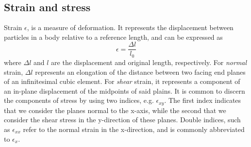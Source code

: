 \documentclass[twoside,english]{uiofysmaster}
\begin{document}
\subsection{Strain and stress}
Strain $\epsilon$, is a measure of deformation. 
It represents the displacement between particles in a body relative to a reference length, and can be expressed as
\begin{equation}
\epsilon = \frac{\Delta l}{l_0}
\end{equation}
where $\Delta l$ and $l$ are the displacement and original length, respectively. 
For \textit{normal} strain, $\Delta l$ represents an elongation of the distance between two facing end planes of an infinitesimal cubic element.
For \textit{shear} strain, it represents a component of an in-plane displacement of the midpoints of said plains.
It is common \cite{theoryOfElasticity,introductionToElasticity} to discern the components of stress by using two indices, e.g. $\epsilon_{xy}$.
The first index indicates that we consider the planes normal to the x-axis, while the second that we consider the shear stress in the y-direction of these planes. 
Double indices, such as $\epsilon_{xx}$ refer to the normal strain in the x-direction, and is commonly abbreviated to   $\epsilon_{x}$.
\end{document}
